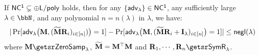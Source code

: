 
\begin{lemma}
\label{lem:core}
If $\assump$ holds, then for any $\{\adv\}\in\ncone$, any sufficiently large $\lambda\in\N$, and any polynomial $n=n(\lambda)$ in $\lambda$, we have:
$$|\Pr[\adv\big(\matr M,(\sM\sR_i)_{i\in[n]})\big)=1]-\Pr[\adv\big(\matr M,(\sM\sR_i+\matI)_{i\in[n]}\big)=1]|\leq\negl(\lambda)$$ where
$\matr M\getsr\zs$, $\sM=\matr M^\top\matr M$ and $\sR_1,\cdots,\sR_n\getsr\sr$.
\end{lemma}

